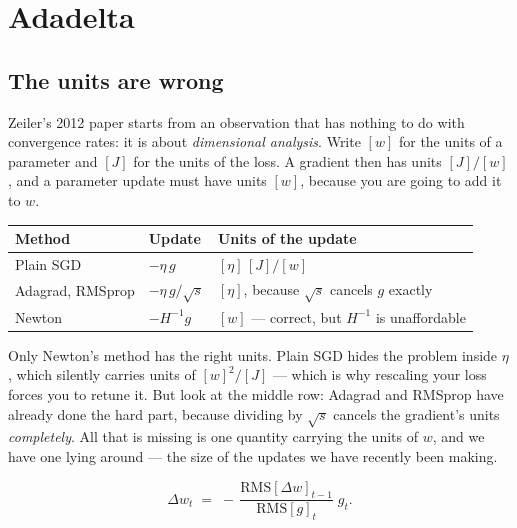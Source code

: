 \documentclass[11pt]{article}
\begin{document}
\section{Adadelta}
\label{sec:adadelta}

\subsection{The units are wrong}

Zeiler's 2012 paper starts from an observation that has nothing to do with
convergence rates: it is about \emph{dimensional analysis}. Write $[w]$ for the
units of a parameter and $[J]$ for the units of the loss. A gradient then has
units $[J]/[w]$, and a parameter update must have units $[w]$, because you are
going to add it to $w$.

\begin{center}
\begin{tabular}{@{}lll@{}}
\toprule
\textbf{Method} & \textbf{Update} & \textbf{Units of the update}\\
\midrule
Plain SGD        & $-\eta\, g$              & $[\eta]\,[J]/[w]$\\[3pt]
Adagrad, RMSprop & $-\eta\, g/\sqrt{s}$     & $[\eta]$, because $\sqrt{s}$
                                              cancels $g$ exactly\\[3pt]
Newton           & $-H^{-1} g$              & $[w]$ --- correct, but $H^{-1}$
                                              is unaffordable\\
\bottomrule
\end{tabular}
\end{center}

Only Newton's method has the right units. Plain SGD hides the problem inside
$\eta$, which silently carries units of $[w]^2/[J]$ --- which is why rescaling
your loss forces you to retune it. But look at the middle row: Adagrad and
RMSprop have already done the hard part, because dividing by $\sqrt{s}$ cancels
the gradient's units \emph{completely}. All that is missing is one quantity
carrying the units of $w$, and we have one lying around --- the size of the
updates we have recently been making.

\begin{equation}
  \label{eq:adadeltaidea}
  \Delta w_t \;=\; -\,\frac{\mathrm{RMS}[\Delta w]_{t-1}}{\mathrm{RMS}[g]_t}
  \; g_t .
\end{equation}
\end{document}
